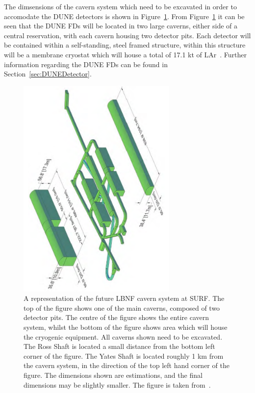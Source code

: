 The dimsensions of the cavern system which need to be excavated in order to accomodate the DUNE detectors is shown in Figure~\ref{fig:DUNECavernSystem}. From Figure~\ref{fig:DUNECavernSystem} it can be seen that the DUNE FDs will be located in two large caverns, either side of a central reservation, with each cavern housing two detector pits. Each detector will be contained within a self-standing, steel framed structure, within this structure will be a membrane cryostat which will house a total of 17.1 kt of LAr~\citep{DUNECDR_V3}. Further information regarding the DUNE FDs can be found in Section~\ref{sec:DUNEDetector}. \\

\begin{figure}
  \centering
  \includegraphics[width=0.7\textwidth]{DUNECavernSystem}
  \caption[A representation of the future LBNF cavern system at SURF]
          {A representation of the future LBNF cavern system at SURF. The top of the figure shows one of the main caverns, composed of two detector pits. The centre of the figure shows the entire cavern system, whilst the bottom of the figure shows area which will house the cryogenic equipment. All caverns shown need to be excavated. The Ross Shaft is located a small distance from the bottom left corner of the figure. The Yates Shaft is located roughly 1 km from the cavern system, in the direction of the top left hand corner of the figure. The dimensions shown are estimations, and the final dimensions may be slightly smaller. The figure is taken from~\citep{DUNECDR_V3}.}
  \label{fig:DUNECavernSystem}
\end{figure}

